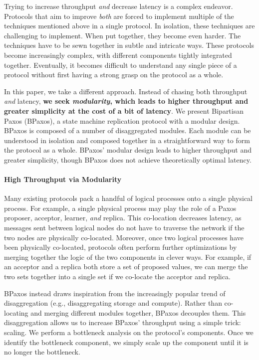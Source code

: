 Trying to increase throughput \emph{and} decrease latency is a complex
endeavor. Protocols that aim to improve \emph{both} are forced to implement
multiple of the techniques mentioned above in a single protocol. In isolation,
these techniques are challenging to implement. When put together, they become
even harder. The techniques have to be sewn together in subtle and intricate
ways. These protocols become increasingly complex, with different components
tightly integrated together. Eventually, it becomes difficult to understand any
single piece of a protocol without first having a strong grasp on
the protocol as a whole.

In this paper, we take a different approach. Instead of chasing both throughput
\emph{and} latency, \textbf{we seek \emph{modularity}, which leads to higher
throughput and greater simplicity at the cost of a bit of latency}. We present
Bipartisan Paxos (BPaxos), a state machine replication protocol with a modular
design. BPaxos is composed of a number of disaggregated modules. Each module
can be understood in isolation and composed together in a straightforward way
to form the protocol as a whole. BPaxos' modular design leads to higher
throughput and greater simplicity, though BPaxos does not achieve theoretically
optimal latency.

\paragraph{High Throughput via Modularity}
Many existing protocols pack a handful of logical processes onto a single
physical process. For example, a single physical process may play the role of a
Paxos proposer, acceptor, learner, \emph{and} replica. This co-location
decreases latency, as messages sent between logical nodes do not have to
traverse the network if the two nodes are physically co-located. Moreover, once
two logical processes have been physically co-located, protocols often perform
further optimizations by merging together the logic of the two components in
clever ways. For example, if an acceptor and a replica both store a set of
proposed values, we can merge the two sets together into a single set if we
co-locate the acceptor and replica.

BPaxos instead draws inspiration from the increasingly popular trend of
disaggregation (e.g., disaggregating storage and compute). Rather than
co-locating and merging different modules together, BPaxos decouples them. This
disaggregation allows us to increase BPaxos' throughput using a simple trick:
scaling. We perform a bottleneck analysis on the protocol's components. Once we
identify the bottleneck component, we simply scale up the component until it is
no longer the bottleneck.

